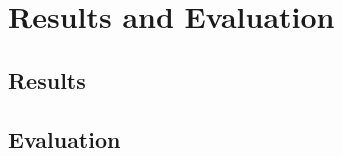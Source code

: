 \documentclass[report.tex]{subfiles}
\begin{document}
\chapter{Results and Evaluation} %
\label{cha:results_and_evaluation}

\section{Results} %
\label{sec:results}

\section{Evaluation} %
\label{sec:evaluation}

\newpage
\end{document}
